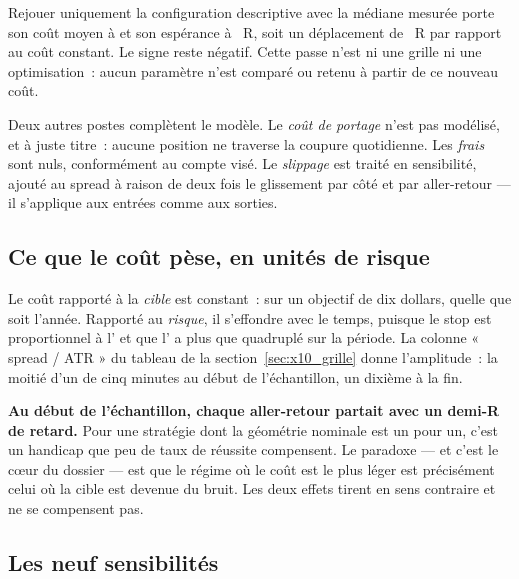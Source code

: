 

Rejouer uniquement la configuration descriptive avec la médiane mesurée
porte son coût moyen à \XTenSpreadMeasuredMean{} et son espérance à
\XTenExpectancyMeasuredSpread{}~R, soit un déplacement de
\XTenDeltaMeasuredSpread{}~R par rapport au coût constant. Le signe reste
négatif. Cette passe n'est ni une grille ni une optimisation~: aucun paramètre
n'est comparé ou retenu à partir de ce nouveau coût.

Deux autres postes complètent le modèle. Le \emph{coût de portage} n'est pas
modélisé, et à juste titre~: aucune position ne traverse la coupure
quotidienne. Les \emph{frais} sont nuls, conformément au compte visé. Le
\emph{slippage} est traité en sensibilité, ajouté au spread à raison de deux
fois le glissement par côté et par aller-retour --- il s'applique aux entrées
comme aux sorties.

\subsection{Ce que le coût pèse, en unités de risque}

Le coût rapporté à la \emph{cible} est constant~: \XTenSpreadUsd{} sur un
objectif de dix dollars, quelle que soit l'année. Rapporté au \emph{risque},
il s'effondre avec le temps, puisque le stop est proportionnel à l'
et que l' a plus que quadruplé sur la période. La colonne
« spread / ATR » du tableau de la section~\ref{sec:x10_grille} donne
l'amplitude~: la moitié d'un  de cinq minutes au début de
l'échantillon, un dixième à la fin.

\begin{insightbox}
\textbf{Au début de l'échantillon, chaque aller-retour partait avec un
demi-R de retard.} Pour une stratégie dont la géométrie nominale est un
pour un, c'est un handicap que peu de taux de réussite compensent. Le paradoxe
--- et c'est le cœur du dossier --- est que le régime où le coût est le plus
léger est précisément celui où la cible est devenue du bruit. Les deux effets
tirent en sens contraire et ne se compensent pas.
\end{insightbox}

\subsection{Les neuf sensibilités}



